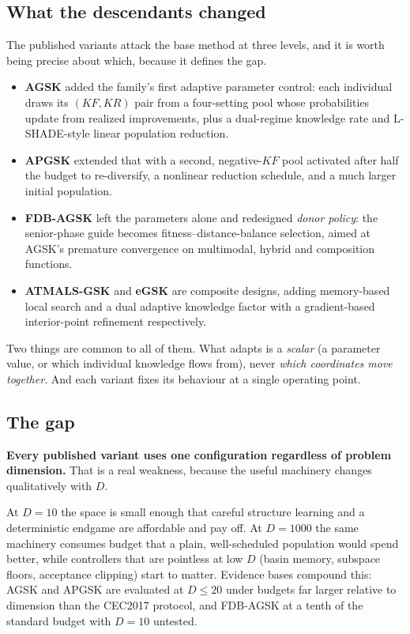 \documentclass[11pt,a4paper]{article}
\newcommand{\hl}[1]{\textbf{#1}}
\begin{document}
\subsection{What the descendants changed}

The published variants attack the base method at three levels, and it is worth
being precise about which, because it defines the gap.

\begin{itemize}[leftmargin=1.2em, itemsep=2pt, topsep=3pt]
\item \hl{AGSK} added the family's first adaptive parameter control: each
      individual draws its $(KF, KR)$ pair from a four-setting pool whose
      probabilities update from realized improvements, plus a dual-regime
      knowledge rate and L-SHADE-style linear population reduction.
\item \hl{APGSK} extended that with a second, negative-$KF$ pool activated
      after half the budget to re-diversify, a nonlinear reduction schedule,
      and a much larger initial population.
\item \hl{FDB-AGSK} left the parameters alone and redesigned \emph{donor
      policy}: the senior-phase guide becomes fitness--distance-balance
      selection, aimed at AGSK's premature convergence on multimodal, hybrid
      and composition functions.
\item \hl{ATMALS-GSK} and \hl{eGSK} are composite designs, adding memory-based
      local search and a dual adaptive knowledge factor with a
      gradient-based interior-point refinement respectively.
\end{itemize}

Two things are common to all of them. What adapts is a \emph{scalar} (a
parameter value, or which individual knowledge flows from), never
\emph{which coordinates move together}. And each variant fixes its behaviour
at a single operating point.

\subsection{The gap}

\hl{Every published variant uses one configuration regardless of problem
dimension.} That is a real weakness, because the useful machinery changes
qualitatively with $D$.

At $D = 10$ the space is small enough that careful structure learning and a
deterministic endgame are affordable and pay off. At $D = 1000$ the same
machinery consumes budget that a plain, well-scheduled population would spend
better, while controllers that are pointless at low $D$ (basin memory,
subspace floors, acceptance clipping) start to matter. Evidence bases compound
this: AGSK and APGSK are evaluated at $D \leq 20$ under budgets far larger
relative to dimension than the CEC2017 protocol, and FDB-AGSK at a tenth of the
standard budget with $D = 10$ untested.
\end{document}
